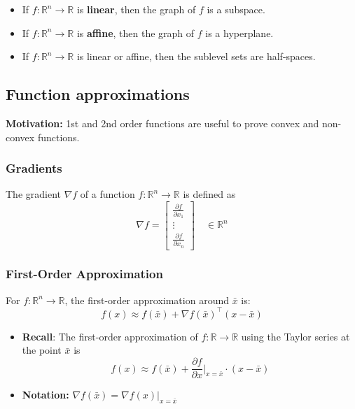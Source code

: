     \begin{definition}
        \begin{itemize}
            \item If $f: \mathbb{R}^n \to \mathbb{R}$ is \textbf{linear}, then the graph of $f$ is a subspace.
            \item If $f: \mathbb{R}^n \to \mathbb{R}$ is \textbf{affine}, then the graph of $f$ is a hyperplane.
            \item If $f: \mathbb{R}^n \to \mathbb{R}$ is linear or affine, then the sublevel sets are half-spaces.
        \end{itemize}
    \end{definition}

\subsection{Function approximations}
\textbf{Motivation:} 1st and 2nd order functions are useful to prove convex and non-convex functions. 
    
    \subsubsection{Gradients}
    \begin{definition}
        The gradient $\nabla f$ of a function $f: \mathbb{R}^n \to \mathbb{R}$ is defined as
        \begin{equation}
            \nabla f = 
            \begin{bmatrix}
                \frac{\partial f}{\partial x_1} \\
                \vdots \\
                \frac{\partial f}{\partial x_n}
            \end{bmatrix}
            \quad \in \mathbb{R}^n
        \end{equation}
    \end{definition}

    \subsubsection{First-Order Approximation}
    \begin{definition}
        For $f: \mathbb{R}^n \to \mathbb{R}$, the first-order approximation around $\bar{x}$ is:
        \begin{equation}
            f(x) \approx f(\bar{x}) + \nabla f(\bar{x})^\top (x - \bar{x})
        \end{equation}

        \begin{itemize}
            \item \textbf{Recall}: The first-order approximation of $f: \mathbb{R} \to \mathbb{R}$ using the Taylor series at the point $\bar{x}$ is
            \[
            f(x) \approx f(\bar{x}) + \frac{\partial f}{\partial x} \bigg|_{x = \bar{x}} \cdot (x - \bar{x})
            \]
            \item \textbf{Notation:} $\nabla f(\bar{x}) = \nabla f(x) \bigg|_{x = \bar{x}}$
        \end{itemize}
    \end{definition}

